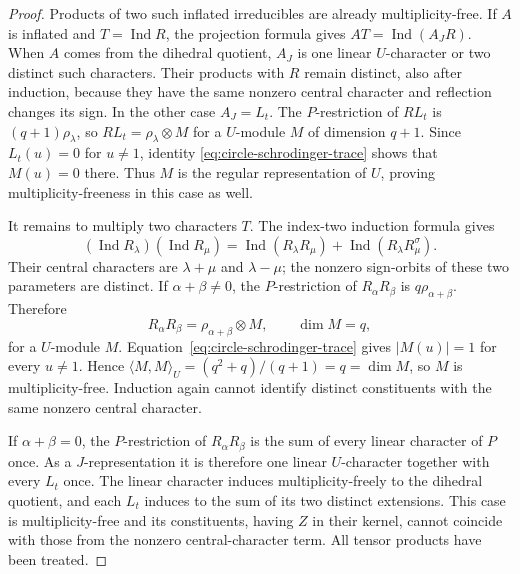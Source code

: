 \documentclass[11pt,a4paper]{amsart}
\theoremstyle{definition}
\theoremstyle{remark}
\numberwithin{equation}{section}
\begin{document}
\begin{proof}
Products of two such inflated irreducibles are already
multiplicity-free. If $A$ is inflated and $T=\operatorname{Ind}R$,
the projection formula gives
$A T=\operatorname{Ind}(A_JR)$. When $A$ comes from the dihedral
quotient, $A_J$ is one linear $U$-character or two distinct such
characters. Their products with $R$ remain distinct, also after
induction, because they have the same nonzero central character
and reflection changes its sign.
In the other case $A_J=L_t$. The $P$-restriction of $RL_t$ is
$(q+1)\rho_\lambda$, so
$RL_t=\rho_\lambda\otimes M$ for a $U$-module $M$ of dimension
$q+1$. Since $L_t(u)=0$ for $u\ne1$, identity
\eqref{eq:circle-schrodinger-trace} shows that $M(u)=0$ there.
Thus $M$ is the regular representation of $U$, proving
multiplicity-freeness in this case as well.

It remains to multiply two characters $T$. The index-two
induction formula gives
\[
 (\operatorname{Ind}R_\lambda)(\operatorname{Ind}R_\mu)
 =\operatorname{Ind}(R_\lambda R_\mu)
  +\operatorname{Ind}(R_\lambda R_\mu^{\sigma}).
\]
Their central characters are $\lambda+\mu$ and $\lambda-\mu$;
the nonzero sign-orbits of these two parameters are distinct.
If $\alpha+\beta\ne0$, the $P$-restriction of
$R_\alpha R_\beta$ is $q\rho_{\alpha+\beta}$. Therefore
\[
 R_\alpha R_\beta=\rho_{\alpha+\beta}\otimes M,
 \qquad \dim M=q,
\]
for a $U$-module $M$. Equation~\eqref{eq:circle-schrodinger-trace}
gives $|M(u)|=1$ for every $u\ne1$. Hence
$\langle M,M\rangle_U=(q^2+q)/(q+1)=q=\dim M$, so $M$ is
multiplicity-free. Induction again cannot identify distinct
constituents with the same nonzero central character.

If $\alpha+\beta=0$, the $P$-restriction of
$R_\alpha R_\beta$ is the sum of every linear character of $P$
once. As a $J$-representation it is therefore one linear
$U$-character together with every $L_t$ once. The linear character
induces multiplicity-freely to the dihedral quotient, and each
$L_t$ induces to the sum of its two distinct extensions.
This case is multiplicity-free and its constituents, having $Z$
in their kernel, cannot coincide with those from the nonzero
central-character term. All tensor products have been treated.
\end{proof}
\end{document}
